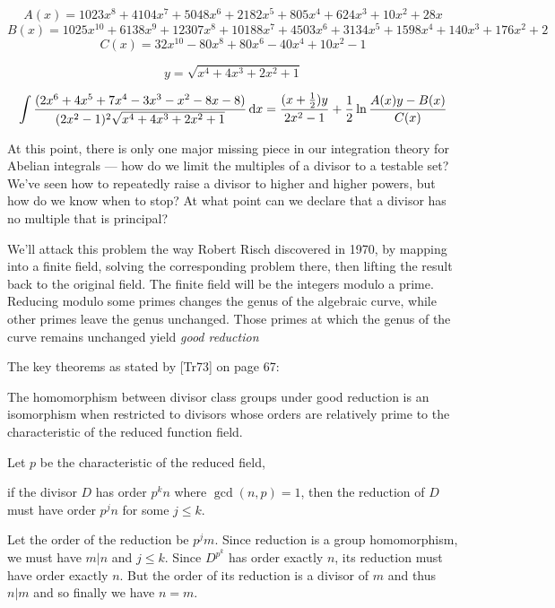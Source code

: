 $$A(x) = 1023x^8+4104x^7+5048x^6+2182x^5+805x^4+624x^3+10x^2+28x$$
$$B(x) = 1025x^{10} + 6138x^9 + 12307x^8 + 10188x^7 + 4503x^6 + 3134x^5 + 1598x^4 + 140x^3 + 176x^2 +2$$
$$C(x) = 32x^{10}-80x^8+80x^6-40x^4+10x^2-1$$

$$y = \sqrt{x^4+4 x^3+2 x^2+1}$$

$$\int {{(2x^6+4x^5+7x^4-3x^3-x^2-8x-8)}\over{(2x^2-1)^2\sqrt{x^4+4 x^3+2 x^2+1}}} \,{\rm d}x
= {{(x+{1\over2})y}\over{2x^2-1}} + {1\over2}\ln{{A(x)y - B(x)}\over{C(x)}}
$$

\endexample


\vfill\eject
{}

At this point, there is only one major missing piece in our
integration theory for Abelian integrals --- how do we limit the
multiples of a divisor to a testable set?  We've seen how to
repeatedly raise a divisor to higher and higher powers, but how do we
know when to stop?  At what point can we declare that a divisor has no
multiple that is principal?

We'll attack this problem the way Robert Risch discovered in 1970, by
mapping into a finite field, solving the corresponding problem there,
then lifting the result back to the original field.  The finite field
will be the integers modulo a prime.  Reducing modulo some primes
changes the genus of the algebraic curve, while other primes leave the
genus unchanged.  Those primes at which the genus of the curve remains
unchanged yield {\it good reduction}

The key theorems as stated by [Tr73] on page 67:

\theorem
The homomorphism between divisor class groups under good reduction
is an isomorphism when restricted to divisors whose orders are
relatively prime to the characteristic of the reduced function field.
\endtheorem

Let $p$ be the characteristic of the reduced field,

\theorem
if the divisor $D$ has order $p^k n$ where $\gcd(n,p)=1$, then
the reduction of $D$ must have order $p^j n$ for some $j\le k$.

\proof
Let the order of the reduction be $p^j m$.  Since reduction
is a group homomorphism, we must have $m|n$ and $j \le k$.
Since $D^{p^k}$ has order exactly $n$, its reduction
must have order exactly $n$.  But the order of its
reduction is a divisor of $m$ and thus $n|m$ and so
finally we have $n=m$.

\endtheorem


